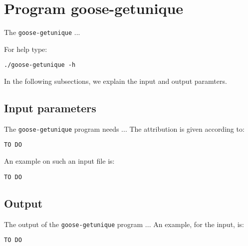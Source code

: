\section{Program goose-getunique}
The \texttt{goose-getunique} ...

For help type:
\begin{lstlisting}
./goose-getunique -h
\end{lstlisting}
In the following subsections, we explain the input and output paramters.

\subsection*{Input parameters}

The \texttt{goose-getunique} program needs ...
The attribution is given according to:
\begin{lstlisting}
TO DO
\end{lstlisting}

An example on such an input file is:
\begin{lstlisting}
TO DO
\end{lstlisting}

\subsection*{Output}
The output of the \texttt{goose-getunique} program ...
An example, for the input, is:
\begin{lstlisting}
TO DO
\end{lstlisting}
